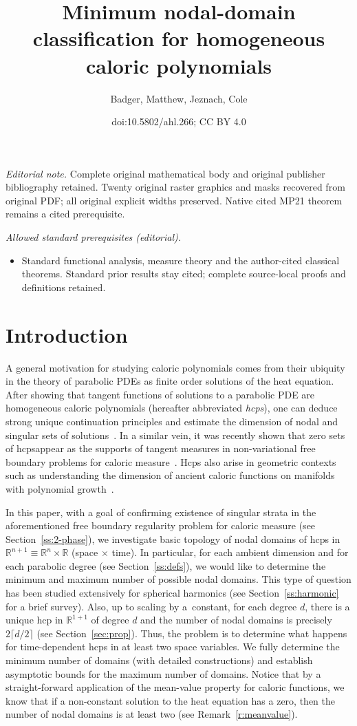 \documentclass[10pt]{amsart}
\title{Minimum nodal-domain classification for homogeneous caloric polynomials}
\author{Badger, Matthew, Jeznach, Cole}
\date{doi:10.5802/ahl.266; CC BY 4.0}
\theoremstyle{definition}\newtheorem{defi}[theo]{Definition}\newtheorem{rema}[theo]{Remark}\newtheorem{exam}[theo]{Example}\newtheorem{exem}[theo]{Example}\newtheorem{nota}[theo]{Notation}
\newcommand{\R}{\mathbb{R}}
\begin{document}
\maketitle
\noindent\textit{Editorial note.} Complete original mathematical body and original publisher bibliography retained. Twenty original raster graphics and masks recovered from original PDF; all original explicit widths preserved. Native cited MP21 theorem remains a cited prerequisite.\par\medskip
\noindent\textit{Allowed standard prerequisites (editorial).}\begin{itemize}
\item Standard functional analysis, measure theory and the author-cited classical theorems. Standard prior results stay cited; complete source-local proofs and definitions retained.
\end{itemize}\medskip

\section{Introduction}\label{s:intro}

A general motivation for studying caloric polynomials comes from their ubiquity in the theory of parabolic PDEs as finite order solutions of the heat equation. After showing that tangent functions of solutions to a parabolic PDE are homogeneous caloric polynomials (hereafter abbreviated \emph{hcps}), one can deduce strong unique continuation principles and estimate the dimension of nodal and singular sets of solutions~\cite{Chen98}. In a similar vein, it was recently shown that zero sets of hcps\linebreak appear as the supports of tangent measures in non-variational free boundary problems for caloric measure~\cite{MP21}. Hcps also arise in geometric contexts such as understanding the dimension of ancient caloric functions on manifolds with polynomial growth~\cite{CM21}.

In this paper, with a goal of confirming existence of singular strata in the aforementioned free boundary regularity problem for caloric measure (see Section~\ref{ss:2-phase}), we investigate basic topology of nodal domains of hcps in $\R^{n+1}\equiv \R^n\times \R$ (space $\times$ time). In particular, for each ambient dimension and for each parabolic degree (see Section~\ref{ss:defs}), we would like to determine the minimum and maximum number of possible nodal domains. This type of question has been studied extensively for spherical harmonics (see Section~\ref{ss:harmonic} for a brief survey). Also, up to scaling by a~constant, for each degree $d$, there is a unique hcp in $\R^{1+1}$ of degree $d$ and the number of nodal domains is precisely $2\lceil d/2\rceil$ (see Section~\ref{sec:prop}). Thus, the problem is to determine what happens for time-dependent hcps in at least two space variables. We fully determine the minimum number of domains (with detailed constructions) and establish asymptotic bounds for the maximum number of domains. Notice that by a straight-forward application of the mean-value property for caloric functions, we know that if a non-constant solution to the heat equation has a zero, then the number of nodal domains is at least two (see Remark~\ref{r:meanvalue}).
\end{document}
